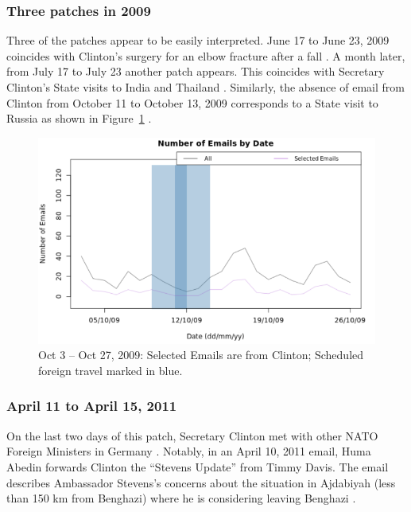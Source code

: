 \documentclass[journal]{vgtc}                %
\begin{document}
\subsubsection{Three patches in 2009}
Three of the patches appear to be easily interpreted.   June 17 to June 23, 2009 coincides with Clinton's surgery for an elbow fracture after a fall \cite{ClintonFracture2009}.  A month later, from July 17 to July 23 another patch appears.  This coincides with Secretary Clinton's State visits to India and Thailand \cite{ForeignSched}.  Similarly, the absence of email from Clinton from October 11 to  October 13, 2009 corresponds to a State visit to Russia as shown in  Figure~\ref{fig:ClintonZerosOctober2009AndForeignSchedule} \cite{ForeignSched, visitRussia}.
\begin{figure}[h]
\begin{center}
\includegraphics[width=0.95\linewidth]{ClintonZerosOctober2009AndForeignSchedule}
\caption{Oct 3 -- Oct 27, 2009:  Selected Emails are from Clinton; Scheduled foreign travel marked in blue.}
\label{fig:ClintonZerosOctober2009AndForeignSchedule}
\end{center}
\end{figure}

\subsubsection{April 11 to April 15, 2011}
On the last two days of %
this patch, Secretary Clinton met with other NATO Foreign Ministers in Germany \cite{ForeignSched}.   Notably, in an April 10, 2011 email, Huma Abedin forwards Clinton the ``Stevens Update'' from Timmy Davis.  The email describes Ambassador Stevens's concerns about the situation in Ajdabiyah (less than 150 km from Benghazi) where he is considering leaving Benghazi \cite{StevensUpdate}.
\end{document}
